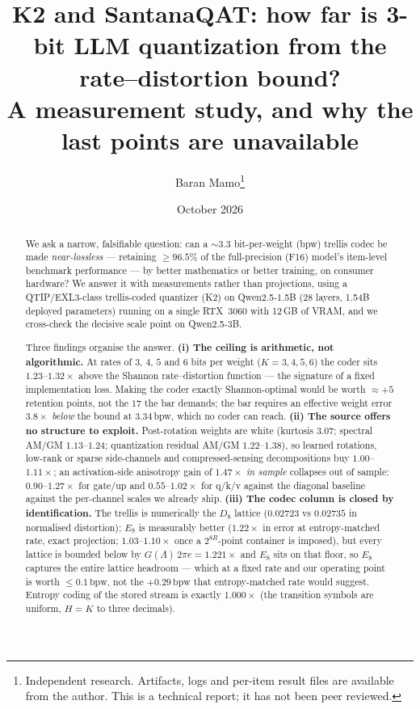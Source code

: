 \documentclass[11pt,a4paper]{article}
\title{\bfseries K2 and SantanaQAT: how far is 3-bit LLM quantization from the
rate--distortion bound?\\[2pt]
\large A measurement study, and why the last points are unavailable}
\author{Baran Mamo\thanks{Independent research. Artifacts, logs and per-item result files
are available from the author. This is a technical report; it has not been peer reviewed.}}
\date{October 2026}
\newcommand{\bpw}{\,\mathrm{bpw}}
\begin{document}
\maketitle

\begin{abstract}
We ask a narrow, falsifiable question: can a $\sim$3.3 bit-per-weight (bpw) trellis codec be
made \emph{near-lossless} --- retaining $\ge 96.5\%$ of the full-precision (F16) model's
item-level benchmark performance --- by better mathematics or better training, on consumer
hardware? We answer it with measurements rather than projections, using a QTIP/EXL3-class
trellis-coded quantizer (K2) on Qwen2.5-1.5B (28 layers, 1.54B deployed parameters) running on a
single RTX~3060 with 12\,GB of VRAM, and we cross-check the decisive scale point on
Qwen2.5-3B.

Three findings organise the answer. \textbf{(i) The ceiling is arithmetic, not algorithmic.}
At rates of $3$, $4$, $5$ and $6$ bits per weight ($K=3,4,5,6$) the coder sits
$1.23$--$1.32\times$ above the Shannon rate--distortion function --- the signature of a fixed
implementation loss. Making the coder exactly Shannon-optimal would be worth $\approx+5$ retention points, not the
$17$ the bar demands; the bar requires an effective weight error $3.8\times$ \emph{below} the
bound at $3.34$\,bpw, which no coder can reach. \textbf{(ii) The source offers no structure to
exploit.} Post-rotation weights are white (kurtosis $3.07$; spectral AM/GM $1.13$--$1.24$;
quantization residual AM/GM $1.22$--$1.38$), so learned rotations, low-rank or sparse
side-channels and compressed-sensing decompositions buy $1.00$--$1.11\times$; an activation-side
anisotropy gain of $1.47\times$ \emph{in sample} collapses out of sample: $0.90$--$1.27\times$ for gate/up
and $0.55$--$1.02\times$ for q/k/v against the diagonal baseline
against the per-channel scales we already ship. \textbf{(iii) The codec column is closed by
identification.} The trellis is numerically the $D_8$ lattice ($0.02723$ vs $0.02735$ in
normalised distortion); $E_8$ is measurably better ($1.22\times$ in error at entropy-matched rate, exact projection;
$1.03$--$1.10\times$ once a $2^{8R}$-point container is imposed),
but every lattice is bounded below by $G(\Lambda)\,2\pi e = 1.221\times$ and $E_8$ sits on that
floor, so $E_8$ captures the entire lattice headroom --- which at a fixed rate and our operating
point is worth $\le0.1\bpw$, not the $+0.29\bpw$ that entropy-matched rate would suggest.
Entropy coding of the stored stream is exactly $1.000\times$ (the transition symbols are uniform,
$H=K$ to three decimals).


\end{abstract}
\end{document}

